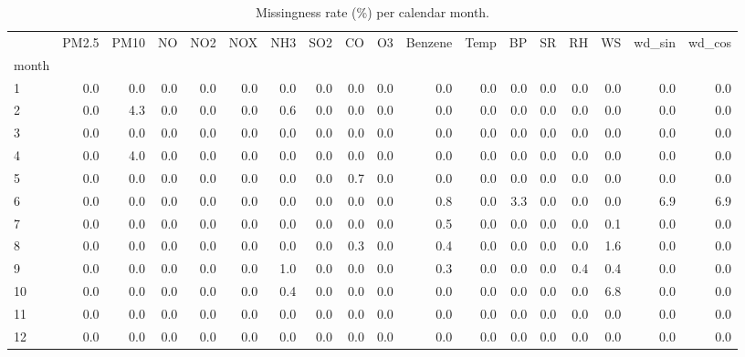 \begin{table}
\caption{Missingness rate (\%) per calendar month.}
\label{tab:missingness_month}
\begin{tabular}{lrrrrrrrrrrrrrrrrr}
\toprule
 & PM2.5 & PM10 & NO & NO2 & NOX & NH3 & SO2 & CO & O3 & Benzene & Temp & BP & SR & RH & WS & wd\_sin & wd\_cos \\
month &  &  &  &  &  &  &  &  &  &  &  &  &  &  &  &  &  \\
\midrule
1 & 0.0 & 0.0 & 0.0 & 0.0 & 0.0 & 0.0 & 0.0 & 0.0 & 0.0 & 0.0 & 0.0 & 0.0 & 0.0 & 0.0 & 0.0 & 0.0 & 0.0 \\
2 & 0.0 & 4.3 & 0.0 & 0.0 & 0.0 & 0.6 & 0.0 & 0.0 & 0.0 & 0.0 & 0.0 & 0.0 & 0.0 & 0.0 & 0.0 & 0.0 & 0.0 \\
3 & 0.0 & 0.0 & 0.0 & 0.0 & 0.0 & 0.0 & 0.0 & 0.0 & 0.0 & 0.0 & 0.0 & 0.0 & 0.0 & 0.0 & 0.0 & 0.0 & 0.0 \\
4 & 0.0 & 4.0 & 0.0 & 0.0 & 0.0 & 0.0 & 0.0 & 0.0 & 0.0 & 0.0 & 0.0 & 0.0 & 0.0 & 0.0 & 0.0 & 0.0 & 0.0 \\
5 & 0.0 & 0.0 & 0.0 & 0.0 & 0.0 & 0.0 & 0.0 & 0.7 & 0.0 & 0.0 & 0.0 & 0.0 & 0.0 & 0.0 & 0.0 & 0.0 & 0.0 \\
6 & 0.0 & 0.0 & 0.0 & 0.0 & 0.0 & 0.0 & 0.0 & 0.0 & 0.0 & 0.8 & 0.0 & 3.3 & 0.0 & 0.0 & 0.0 & 6.9 & 6.9 \\
7 & 0.0 & 0.0 & 0.0 & 0.0 & 0.0 & 0.0 & 0.0 & 0.0 & 0.0 & 0.5 & 0.0 & 0.0 & 0.0 & 0.0 & 0.1 & 0.0 & 0.0 \\
8 & 0.0 & 0.0 & 0.0 & 0.0 & 0.0 & 0.0 & 0.0 & 0.3 & 0.0 & 0.4 & 0.0 & 0.0 & 0.0 & 0.0 & 1.6 & 0.0 & 0.0 \\
9 & 0.0 & 0.0 & 0.0 & 0.0 & 0.0 & 1.0 & 0.0 & 0.0 & 0.0 & 0.3 & 0.0 & 0.0 & 0.0 & 0.4 & 0.4 & 0.0 & 0.0 \\
10 & 0.0 & 0.0 & 0.0 & 0.0 & 0.0 & 0.4 & 0.0 & 0.0 & 0.0 & 0.0 & 0.0 & 0.0 & 0.0 & 0.0 & 6.8 & 0.0 & 0.0 \\
11 & 0.0 & 0.0 & 0.0 & 0.0 & 0.0 & 0.0 & 0.0 & 0.0 & 0.0 & 0.0 & 0.0 & 0.0 & 0.0 & 0.0 & 0.0 & 0.0 & 0.0 \\
12 & 0.0 & 0.0 & 0.0 & 0.0 & 0.0 & 0.0 & 0.0 & 0.0 & 0.0 & 0.0 & 0.0 & 0.0 & 0.0 & 0.0 & 0.0 & 0.0 & 0.0 \\
\bottomrule
\end{tabular}
\end{table}
